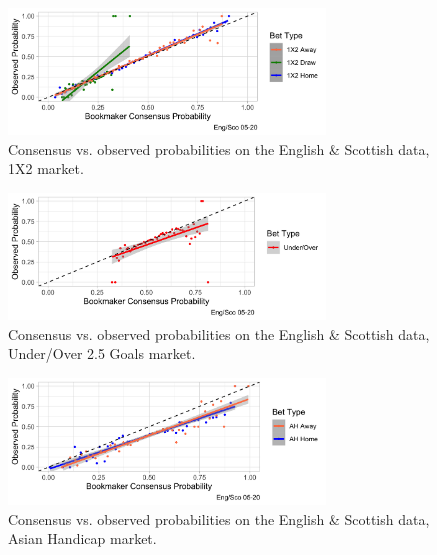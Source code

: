 \documentclass[a4paper,10pt]{report}
\begin{document}
\begin{figure}[h!]\begin{center}
	\includegraphics[width=0.75\textwidth]{ensco_10_convobs_1x2.png}
	\caption{Consensus vs. observed probabilities on the English \& Scottish data, 1X2 market.}\label{FIG:02_convobs_1x2}
\end{center}\end{figure}
\begin{figure}[h!]\begin{center}
	\includegraphics[width=0.75\textwidth]{ensco_11_convobs_uo.png}
	\caption{Consensus vs. observed probabilities on the English \& Scottish data, Under/Over 2.5 Goals market.}\label{FIG:02_convobs_uo}
\end{center}\end{figure}

\begin{figure}[h!]\begin{center}
	\includegraphics[width=0.75\textwidth]{ensco_12_convobs_ah.png}
	\caption{Consensus vs. observed probabilities on the English \& Scottish data, Asian Handicap market.}\label{FIG:02_convobs_ah}
\end{center}\end{figure}

\pagebreak
\end{document}
